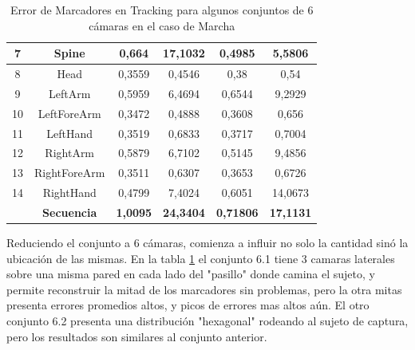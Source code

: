 \begin{table}[h]
\begin{tabular}{c|c|c|c|c|c|}
\multicolumn{1}{|c|}{7} & Spine & 0,664 & 17,1032 & 0,4985 & 5,5806 \\ \hline
\multicolumn{1}{|c|}{8} & Head & 0,3559 & 0,4546 & 0,38 & 0,54 \\ \hline
\multicolumn{1}{|c|}{9} & LeftArm & 0,5959 & 6,4694 & 0,6544 & 9,2929 \\ \hline
\multicolumn{1}{|c|}{10} & LeftForeArm & 0,3472 & 0,4888 & 0,3608 & 0,656 \\ \hline
\multicolumn{1}{|c|}{11} & LeftHand & 0,3519 & 0,6833 & 0,3717 & 0,7004 \\ \hline
\multicolumn{1}{|c|}{12} & RightArm & 0,5879 & 6,7102 & 0,5145 & 9,4856 \\ \hline
\multicolumn{1}{|c|}{13} & RightForeArm & 0,3511 & 0,6307 & 0,3653 & 0,6726 \\ \hline
\multicolumn{1}{|c|}{14} & RightHand & 0,4799 & 7,4024 & 0,6051 & 14,0673 \\ \hline
 & \textbf{Secuencia} & \textbf{1,0095} & \textbf{24,3404} & \textbf{0,71806} & \textbf{17,1131} \\ \cline{2-6} 
\end{tabular}
\label{error_captura_marcha_61_62_camaras}
\caption{Error de Marcadores en Tracking para algunos conjuntos de 6 cámaras en el caso de Marcha}
\end{table}

Reduciendo el conjunto a 6 cámaras, comienza a influir no solo la cantidad sinó la ubicación de las mismas. En la tabla \ref{error_captura_marcha_61_62_camaras} el conjunto 6.1 tiene 3 camaras laterales sobre una misma pared en cada lado del "pasillo" donde camina el sujeto, y permite reconstruir la mitad de los marcadores sin problemas, pero la otra mitas presenta errores promedios altos, y picos de errores mas altos aún. El otro conjunto 6.2 presenta una distribución "hexagonal" rodeando al sujeto de captura, pero los resultados son similares al conjunto anterior.

